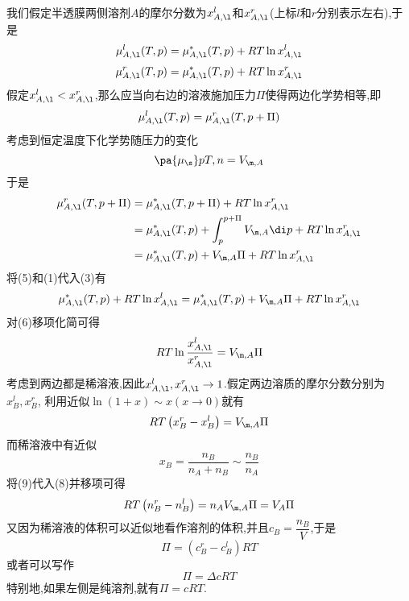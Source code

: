 \documentclass{ctexart}
\begin{document}
\begin{derivation}\setcounter{equation}{0}
    我们假定半透膜两侧溶剂$A$的摩尔分数为$x_{A,\l}^{l}$和$x_{A,\l}^{r}$(上标$l$和$r$分别表示左右),于是
    \begin{equation}\mu_{A,\l}^l(T,p)=\mu_{A,\l}^\ast(T,p)+RT\ln x_{A,\l}^l\end{equation}
    \begin{equation}\mu_{A,\l}^r(T,p)=\mu_{A,\l}^\ast(T,p)+RT\ln x_{A,\l}^r\end{equation}
    假定$x_{A,\l}^l<x_{A,\l}^r$,那么应当向右边的溶液施加压力$\Pi$使得两边化学势相等,即
    \begin{equation}\mu_{A,\l}^l(T,p)=\mu_{A,\l}^r(T,p+\Pi)\end{equation}
    考虑到恒定温度下化学势随压力的变化
    \begin{equation}\pa{\mu_\s}p{T,n}=V_{\m,A}\end{equation}
    于是
    \begin{equation}
        \begin{aligned}
            \mu_{A,\l}^r(T,p+\Pi)
            &= \mu_{A,\l}^\ast(T,p+\Pi)+RT\ln x_{A,\l}^r \\
            &= \mu_{A,\l}^\ast(T,p)+\int_{p}^{p+\Pi}V_{\m,A}\di p+RT\ln x_{A,\l}^r \\
            &= \mu_{A,\l}^\ast(T,p)+V_{\m,A}\Pi+RT\ln x_{A,\l}^r
        \end{aligned}
    \end{equation}
    将(5)和(1)代入(3)有
    \begin{equation}
        \mu_{A,\l}^\ast(T,p)+RT\ln x_{A,\l}^l=\mu_{A,\l}^\ast(T,p)+V_{\m,A}\Pi+RT\ln x_{A,\l}^r
    \end{equation}
    对(6)移项化简可得
    \begin{equation}
        RT\ln\dfrac{x_{A,\l}^l}{x_{A,\l}^r}=V_{\m,A}\Pi
    \end{equation}
    考虑到两边都是稀溶液,因此$x_{A,\l}^l,x_{A,\l}^r\to1$.假定两边溶质的摩尔分数分别为$x_{B}^l,x_B^r$,%
    利用近似$\ln(1+x)\sim x(x\to0)$就有
    \begin{equation}RT\left(x_{B}^r-x_{B}^l\right)=V_{\m,A}\Pi\end{equation}
    而稀溶液中有近似
    \begin{equation}x_B=\dfrac{n_B}{n_A+n_B}\sim\dfrac{n_B}{n_A}\end{equation}
    将(9)代入(8)并移项可得
    \begin{equation}RT\left(n_B^r-n_B^l\right)=n_AV_{\m,A}\Pi=V_{A}\Pi\end{equation}
    又因为稀溶液的体积可以近似地看作溶剂的体积,并且$c_B=\dfrac{n_B}{V}$,于是
    \begin{equation}\Pi=\left(c_B^r-c_B^l\right)RT\end{equation}
    或者可以写作
    \begin{equation}
        \Pi=\Delta cRT
    \end{equation}
    特别地,如果左侧是纯溶剂,就有$\Pi=cRT$.
\end{derivation}
\end{document}
